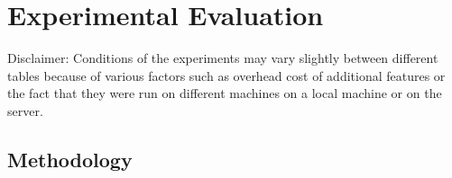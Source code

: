 \documentclass[runningheads,a4paper,draft]{svjour3}
\def\tactictoe{\textsf{TacticToe}\xspace}
\begin{document}
%





\section{Experimental Evaluation}\label{s:experiments}

Disclaimer:
Conditions of the experiments may vary slightly between different tables 
because of various factors such 
as overhead cost of additional features or the fact that they were run on 
different machines on a local machine or on the server.

\subsection{Methodology} 
\end{document}

